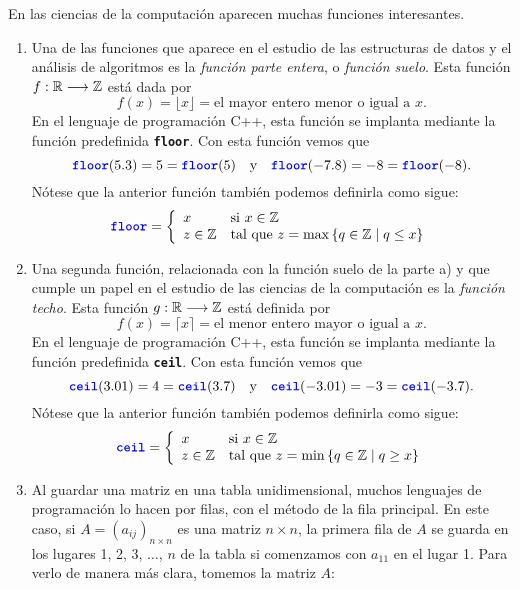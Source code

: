 \begin{myexample}
    En las ciencias de la computación aparecen muchas funciones interesantes.
    \begin{enumerate}[label=\alph*)]
        \item Una de las funciones que aparece en el estudio de las estructuras de datos y el análisis de algoritmos es la \textit{función parte entera}, o \textit{función suelo}. Esta función $f:\RR \longrightarrow \ZZ$ está dada por
        $$f(x) = \lfloor x \rfloor = \text{el mayor entero menor o igual a $x$}.$$
        En el lenguaje de programación C++, esta función se implanta mediante la función predefinida \textbf{\texttt{\color{blue}floor}}. Con esta función vemos que
        $$\textbf{\texttt{\color{blue}floor}}(5.3) = 5 = \textbf{\texttt{\color{blue}floor}}(5) \quad \text{y} \quad \textbf{\texttt{\color{blue}floor}}(-7.8) = -8 = \textbf{\texttt{\color{blue}floor}} (-8).$$
        Nótese que la anterior función también podemos definirla como sigue:
        $$ \textbf{\texttt{\color{blue}floor}} = \left\{ \begin{array}{ll}
            x & \text{si } x \in \ZZ \\
            z \in \ZZ & \text{tal que } z = \max \left\{ q \in \ZZ \mid q \leq x \right\}
        \end{array} \right.$$
        \item Una segunda función, relacionada con la función suelo de la parte a) y que cumple un papel en el estudio de las ciencias de la computación es la \textit{función techo}. Esta función $g: \RR \longrightarrow \ZZ$ está definida por
        $$f(x) = \lceil x \rceil = \text{el menor entero mayor o igual a $x$}.$$
        En el lenguaje de programación C++, esta función se implanta mediante la función predefinida \textbf{\texttt{\color{blue}ceil}}. Con esta función vemos que
        $$\textbf{\texttt{\color{blue}ceil}}(3.01) = 4 = \textbf{\texttt{\color{blue}ceil}}(3.7) \quad \text{y} \quad \textbf{\texttt{\color{blue}ceil}}(-3.01) = -3 = \textbf{\texttt{\color{blue}ceil}} (-3.7).$$
        Nótese que la anterior función también podemos definirla como sigue:
        $$ \textbf{\texttt{\color{blue}ceil}} = \left\{ \begin{array}{ll}
            x & \text{si } x \in \ZZ \\
            z \in \ZZ & \text{tal que } z = \min \left\{ q \in \ZZ \mid q \geq x \right\}
        \end{array} \right.$$
        \item Al guardar una matriz en una tabla unidimensional, muchos lenguajes de programación lo hacen por filas, con el método de la fila principal. En este caso, si $A = (a_{ij})_{n \times n}$ es una matriz $n \times n$, la primera fila de $A$ se guarda en los lugares 1, 2, 3, $\dots$, $n$ de la tabla si comenzamos con $a_{11}$ en el lugar 1. Para verlo de manera más clara, tomemos la matriz $A$:

\end{enumerate}
\end{myexample}
